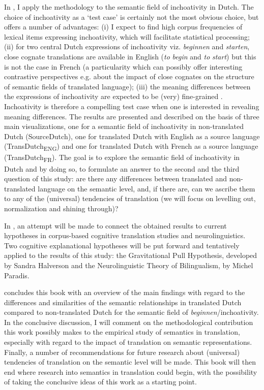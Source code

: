 In , I apply the methodology to the semantic field of inchoativity in Dutch. The choice of inchoativity as a ‘test case’ is certainly not the most obvious choice, but offers a number of advantages: (i) I expect to find high corpus frequencies of lexical items expressing inchoativity, which will facilitate statistical processing; (ii) for two central Dutch expressions of inchoativity viz. \textit{beginnen} and \textit{starten}, close cognate translations are available in English (\textit{to} \textit{begin} and \textit{to} \textit{start}) but this is not the case in French (a particularity which can possibly offer interesting contrastive perspectives e.g. about the impact of close cognates on the structure of semantic fields of translated language); (iii) the meaning differences between the expressions of inchoativity are expected to be (very) fine-grained \citep{zettersten_introspection_1996}. Inchoativity is therefore a compelling test case when one is interested in revealing meaning differences. The results are presented and described on the basis of three main visualizations, one for a semantic field of inchoativity in non-translated Dutch (SourceDutch), one for translated Dutch with English as a source language (TransDutch\textsubscript{ENG}) and one for translated Dutch with French as a source language (TransDutch\textsubscript{FR}). The goal is to explore the semantic field of inchoativity in Dutch and by doing so, to formulate an answer to the second and the third question of this study: are there any differences between translated and non-translated language on the semantic level, and, if there are, can we ascribe them to any of the (universal) tendencies of translation (we will focus on levelling out, normalization and shining through)?

In , an attempt will be made to connect the obtained results to current hypotheses in corpus-based cognitive translation studies and neurolinguistics. Two cognitive explanational hypotheses will be put forward and tentatively applied to the results of this study: the Gravitational Pull Hypothesis, developed by Sandra Halverson and the Neurolinguistic Theory of Bilingualism, by Michel Paradis.

 concludes this book with an overview of the main findings with regard to the differences and similarities of the semantic relationships in translated Dutch compared to non-translated Dutch for the semantic field of \textit{beginnen}/inchoativity. In the conclusive discussion, I will comment on the methodological contribution this work possibly makes to the empirical study of semantics in translation, especially with regard to the impact of translation on semantic representations. Finally, a number of recommendations for future research about (universal) tendencies of translation on the semantic level will be made. This book will then end where research into semantics in translation could begin, with the possibility of taking the conclusive ideas of this work as a starting point.
